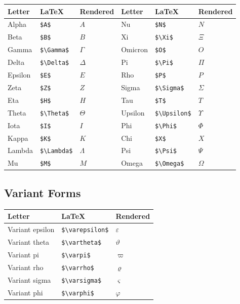\documentclass[
  letterpaper,
  DIV=11,
  numbers=noendperiod]{scrartcl}
\begin{document}
\begin{longtable}[]{@{}llllll@{}}
\toprule()
Letter & LaTeX & Rendered & Letter & LaTeX & Rendered \\
\midrule()
\endhead
Alpha & \texttt{\$A\$} & \(A\) & Nu & \texttt{\$N\$} & \(N\) \\
Beta & \texttt{\$B\$} & \(B\) & Xi & \texttt{\$\textbackslash{}Xi\$} &
\(\Xi\) \\
Gamma & \texttt{\$\textbackslash{}Gamma\$} & \(\Gamma\) & Omicron &
\texttt{\$O\$} & \(O\) \\
Delta & \texttt{\$\textbackslash{}Delta\$} & \(\Delta\) & Pi &
\texttt{\$\textbackslash{}Pi\$} & \(\Pi\) \\
Epsilon & \texttt{\$E\$} & \(E\) & Rho & \texttt{\$P\$} & \(P\) \\
Zeta & \texttt{\$Z\$} & \(Z\) & Sigma &
\texttt{\$\textbackslash{}Sigma\$} & \(\Sigma\) \\
Eta & \texttt{\$H\$} & \(H\) & Tau & \texttt{\$T\$} & \(T\) \\
Theta & \texttt{\$\textbackslash{}Theta\$} & \(\Theta\) & Upsilon &
\texttt{\$\textbackslash{}Upsilon\$} & \(\Upsilon\) \\
Iota & \texttt{\$I\$} & \(I\) & Phi & \texttt{\$\textbackslash{}Phi\$} &
\(\Phi\) \\
Kappa & \texttt{\$K\$} & \(K\) & Chi & \texttt{\$X\$} & \(X\) \\
Lambda & \texttt{\$\textbackslash{}Lambda\$} & \(\Lambda\) & Psi &
\texttt{\$\textbackslash{}Psi\$} & \(\Psi\) \\
Mu & \texttt{\$M\$} & \(M\) & Omega & \texttt{\$\textbackslash{}Omega\$}
& \(\Omega\) \\
\bottomrule()
\end{longtable}

\hypertarget{variant-forms}{%
\subsection{Variant Forms}\label{variant-forms}}

\begin{longtable}[]{@{}lll@{}}
\toprule()
Letter & LaTeX & Rendered \\
\midrule()
\endhead
Variant epsilon & \texttt{\$\textbackslash{}varepsilon\$} &
\(\varepsilon\) \\
Variant theta & \texttt{\$\textbackslash{}vartheta\$} & \(\vartheta\) \\
Variant pi & \texttt{\$\textbackslash{}varpi\$} & \(\varpi\) \\
Variant rho & \texttt{\$\textbackslash{}varrho\$} & \(\varrho\) \\
Variant sigma & \texttt{\$\textbackslash{}varsigma\$} & \(\varsigma\) \\
Variant phi & \texttt{\$\textbackslash{}varphi\$} & \(\varphi\) \\
\bottomrule()
\end{longtable}
\end{document}
